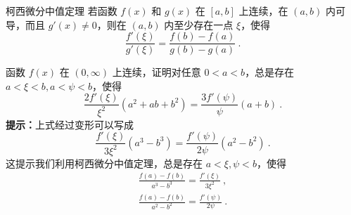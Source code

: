 \begin{theorem}{柯西微分中值定理}\label{the_MeanTh_3}
若函数 $f(x)$ 和 $g(x)$ 在 $[a,b]$ 上连续，在 $(a,b)$ 内可导，而且 $g'(x)\neq 0$，则在 $(a,b)$ 内至少存在一点 $\xi$，使得
\begin{equation}\label{eq_MeanTh_1}{}
\frac{f'(\xi)}{g'(\xi)}=\frac{f(b)-f(a)}{g(b)-g(a)}~.
\end{equation}
\end{theorem}
\begin{exercise}{}
函数 $f(x)$ 在 $(0,\infty)$ 上连续，证明对任意 $0 < a < b$，总是存在 $a < \xi < b, a< \psi <b$，使得
\begin{equation}
\frac{2f'(\xi)}{\xi^2}(a^2+ab+b^2)=\frac{3f'(\psi)}{\psi}(a+b)~.
\end{equation}
\textbf{提示：}上式经过变形可以写成
\begin{equation}
\frac{f'(\xi)}{3\xi^2}(a^3-b^3)=\frac{f'(\psi)}{2\psi}(a^2-b^2)~.
\end{equation}
这提示我们利用柯西微分中值定理，总是存在 $a<\xi,\psi<b$，使得
\begin{equation}
\begin{aligned}
\frac{f(a)-f(b)}{a^3-b^3}=\frac{f'(\xi)}{3\xi^2}~,\\
\frac{f(a)-f(b)}{a^2-b^2}=\frac{f'(\psi)}{2\psi}~.
\end{aligned}
\end{equation}
\end{exercise}
